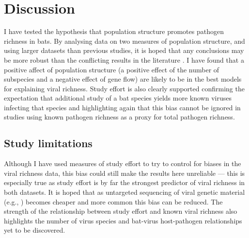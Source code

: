 
\section{Discussion}  



I have tested the hypothesis that population structure promotes pathogen richness in bats.
By analysing data on two measures of population structure, and using larger datasets than previous studies, it is hoped that any conclusions may be more robust than the conflicting results in the literature \cite{gay2014parasite, turmelle2009correlates, maganga2014bat}.
I have found that a positive affect of population structure (a positive effect of the number of subspecies and a negative effect of gene flow) are likely to be in the best models for explaining viral richness.
Study effort is also clearly supported confirming the expectation that additional study of a bat species yields more known viruses infecting that species and highlighting again that this bias cannot be ignored in studies using known pathogen richness as a proxy for total pathogen richness.


\subsection{Study limitations}

Although I have used measures of study effort to try to control for biases in the viral richness data, this bias could still make the results here unreliable --- this is especially true as study effort is by far the strongest predictor of viral richness in both datasets.
It is hoped that as untargeted sequencing of viral genetic material (e.g., \textcite{anthony2013strategy}) becomes cheaper and more common this bias can be reduced.
The strength of the relationship between study effort and known viral richness also highlights the number of virus species and bat-virus host-pathogen relationships yet to be discovered.

